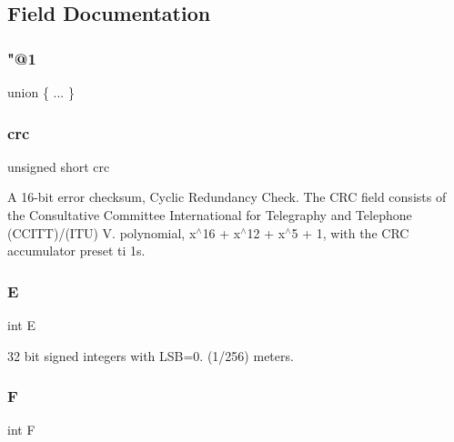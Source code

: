 \subsection{Field Documentation}
\mbox{\label{struct_m_i_d_c__01_aa30fb6fb5084e023ab402731b4bff2d7}} 
\subsubsection{\texorpdfstring{"@1}{@1}}
{\footnotesize\ttfamily union \{ ... \} }

\mbox{\label{struct_m_i_d_c__01_a0e34886f35a1dc651e0caf46a73e27ab}} 
\subsubsection{\texorpdfstring{crc}{crc}}
{\footnotesize\ttfamily unsigned short crc}

A 16-\/bit error checksum, Cyclic Redundancy Check. The C\+RC field consists of the Consultative Committee International for Telegraphy and Telephone (C\+C\+I\+TT)/(I\+TU) V. polynomial, x$^\wedge$16 + x$^\wedge$12 + x$^\wedge$5 + 1, with the C\+RC accumulator preset ti 1\textquotesingle{}s. \mbox{\label{struct_m_i_d_c__01_a105a63272424d04208f33bac739acf98}} 
\subsubsection{\texorpdfstring{E}{E}}
{\footnotesize\ttfamily int E}

32 bit signed integers with L\+SB=0. (1/256) meters. \mbox{\label{struct_m_i_d_c__01_a83e4d55f5823e12da6439ef69be4a42a}} 
\subsubsection{\texorpdfstring{F}{F}}
{\footnotesize\ttfamily int F}

\mbox{\label{struct_m_i_d_c__01_ab8735735273b982cc3125e51fe46e2f4}} 
